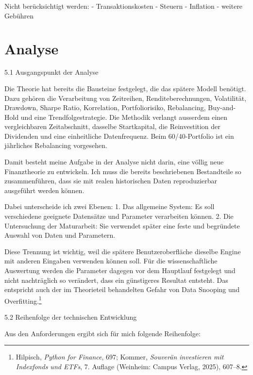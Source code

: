 \documentclass[
  ngerman,
  a4paper,
  DIV=11,
  oneside]{scrreprt}
\begin{document}
Nicht berücksichtigt werden: - Transaktionskosten - Steuern - Inflation
- weitere Gebühren


\chapter{Analyse}\label{analyse}

5.1 Ausgangspunkt der Analyse

Die Theorie hat bereits die Bausteine festgelegt, die das spätere Modell
benötigt. Dazu gehören die Verarbeitung von Zeitreihen,
Renditeberechnungen, Volatilität, Drawdown, Sharpe Ratio, Korrelation,
Portfoliorisiko, Rebalancing, Buy-and-Hold und eine Trendfolgestrategie.
Die Methodik verlangt ausserdem einen vergleichbaren Zeitabschnitt,
dasselbe Startkapital, die Reinvestition der Dividenden und eine
einheitliche Datenfrequenz. Beim 60/40-Portfolio ist ein jährliches
Rebalancing vorgesehen.

Damit besteht meine Aufgabe in der Analyse nicht darin, eine völlig neue
Finanztheorie zu entwickeln. Ich muss die bereits beschriebenen
Bestandteile so zusammenführen, dass sie mit realen historischen Daten
reproduzierbar ausgeführt werden können.

Dabei unterscheide ich zwei Ebenen: 1. Das allgemeine System: Es soll
verschiedene geeignete Datensätze und Parameter verarbeiten können. 2.
Die Untersuchung der Maturarbeit: Sie verwendet später eine feste und
begründete Auswahl von Daten und Parametern.

Diese Trennung ist wichtig, weil die spätere Benutzeroberfläche dieselbe
Engine mit anderen Eingaben verwenden können soll. Für die
wissenschaftliche Auswertung werden die Parameter dagegen vor dem
Hauptlauf festgelegt und nicht nachträglich so verändert, dass ein
günstigeres Resultat entsteht. Das entspricht auch der im Theorieteil
behandelten Gefahr von Data Snooping und Overfitting.\footnote{Hilpisch,
  \emph{Python for Finance}, 697; Kommer, \emph{Souverän investieren mit
  Indexfonds und ETFs}, 7. Auflage (Weinheim: Campus Verlag, 2025),
  607--8.}

5.2 Reihenfolge der technischen Entwicklung

Aus den Anforderungen ergibt sich für mich folgende Reihenfolge:
\end{document}
